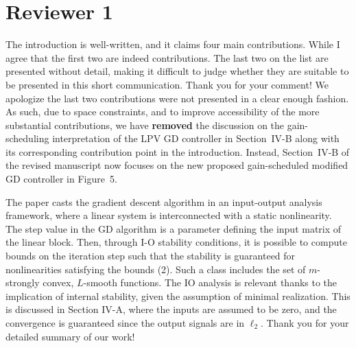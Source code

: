 \section*{Reviewer 1}\label{sec:reviewer1}
\renewcommand{\theequation}{R1.\arabic{equation}}
\setcounter{equation}{0}
\begin{rebuttal}[resolved]
    {%
        The introduction is well-written, and it claims four main contributions. While I agree that the first two are indeed contributions. The last two on the list are presented without detail, making it difficult to judge whether they are suitable to be presented in this short communication.
    }%
    {%
        Thank you for your comment! We apologize the last two contributions were not presented in a clear enough fashion. As such, due to space constraints, and to improve accessibility of the more substantial contributions, we have \textbf{removed} the discussion on the gain-scheduling interpretation of the LPV GD controller in Section~IV-B along with its corresponding contribution point in the introduction. Instead, Section~IV-B of the revised manuscript now focuses on the new proposed gain-scheduled modified GD controller in Figure~5.
    }%
\end{rebuttal}
\begin{rebuttal}[resolved]
    {%
        The paper casts the gradient descent algorithm in an input-output analysis framework, where a linear system is interconnected with a static nonlinearity. The step value in the GD algorithm is a parameter defining the input matrix of the linear block. Then, through I-O stability conditions, it is possible to compute bounds on the iteration step such that the stability is guaranteed for nonlinearities satisfying the bounds (2). Such a class includes the set of $m$-strongly convex, $L$-smooth functions. The IO analysis is relevant thanks to the implication of internal stability, given the assumption of minimal realization. This is discussed in Section IV-A, where the inputs are assumed to be zero, and the convergence is guaranteed since the output signals are in \(\ell_2\).
    }%
    {%
        Thank you for your detailed summary of our work!
    }%
\end{rebuttal}

